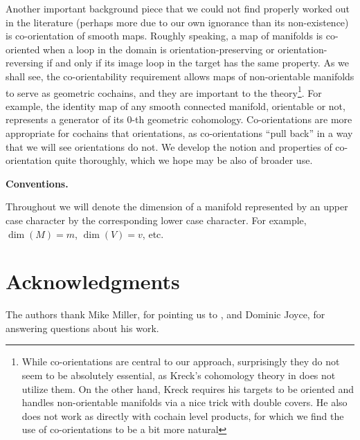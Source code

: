 Another important background piece that we could not find properly worked out in the literature (perhaps more due to our own ignorance than its non-existence) is co-orientation of smooth maps.
Roughly speaking, a map of manifolds is co-oriented when a loop in the domain is orientation-preserving or orientation-reversing if and only if its image loop in the target has the same property.
As we shall see, the co-orientability requirement allows maps of non-orientable manifolds to serve as geometric cochains, and they are important to the theory\footnote{While co-orientations are central to our approach, surprisingly they do not seem to be absolutely essential, as Kreck's cohomology theory in \cite{Krec10} does not utilize them.
On the other hand, Kreck requires his targets to be oriented and handles non-orientable manifolds via a nice trick with double covers.
He also does not work as directly with cochain level products, for which we find the use of co-orientations to be a bit more natural}.
For example, the identity map of any smooth connected manifold, orientable or not, represents a generator of its $0$-th geometric cohomology.
Co-orientations are more appropriate for cochains that orientations, as co-orientations ``pull back'' in a way that we will see orientations do not.
We develop the notion and properties of co-orientation quite thoroughly, which we hope may be also of broader use.

\textbf{Conventions.}

Throughout we will denote the dimension of a manifold represented by an upper case character by the corresponding lower case character.
For example, $\dim(M)=m$, $\dim(V)=v$, etc.

\section*{Acknowledgments}

The authors thank Mike Miller, for pointing us to \cite{Lipy14}, and Dominic Joyce, for answering  questions about his work.